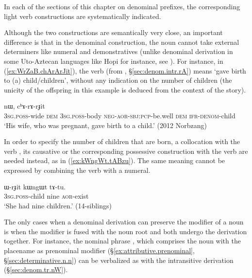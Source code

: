 In each of the sections of this chapter on denominal prefixes, the corresponding light verb constructions are systematically indicated.

Although the two constructions are semantically very close, an important difference is that in the denominal construction, the noun cannot take external determiners like numeral and demonstratives (unlike denominal derivation in some Uto-Aztecan languages like Hopi for instance, see \citealt{hill.kc03hopi}). For instance, in (\ref{ex:WrZaB.chArArJit}), the verb  (from , §\ref{sec:denom.intr.rA}) means `gave birth to (a) child/children', without any indication on the number of children (the unicity of the offspring in this example is deduced from the context of the story).

\begin{exe}
\ex \label{ex:WrZaB.chArArJit}
 nɯ, cʰɤ-rɤ-rɟit \\
 \textsc{3sg}.\textsc{poss}-wide \textsc{dem} \textsc{3sg}.\textsc{poss}-body \textsc{neg}-\textsc{aor}-\textsc{sbj}:\textsc{pcp}-be.well \textsc{dem} \textsc{ifr}-\textsc{denom}-child \\
\glt `His wife, who was pregnant, gave birth to a child.' (2012 Norbzang)
\end{exe}

In order to specify the number of children that are born, a collocation with the verb , its causative  or the corresponding possessive construction with the verb  are needed instead, as in (\ref{ex:kWngWt.tABzu}). The same meaning cannot be expressed by combining the verb  with a numeral.

\begin{exe}
\ex \label{ex:kWngWt.tABzu}
\gll  ɯ-rɟit kɯngɯt tɤ-tu. \\
 \textsc{3sg}.\textsc{poss}-child nine \textsc{aor}-exist \\
\glt `She had nine children.' (14-siblings) 
\end{exe}

The only cases when a denominal derivation can preserve the modifier of a noun is when the modifier is fused with the noun root and both undergo the derivation together. For instance, the nominal phrase , which comprises the noun  with the placename   as prenominal modifier (§\ref{ex:attributive.prenominal}, §\ref{sec:determinative.n.n}) can be verbalized as  with the intransitive  derivation (§\ref{sec:denom.tr.nW}).
 
